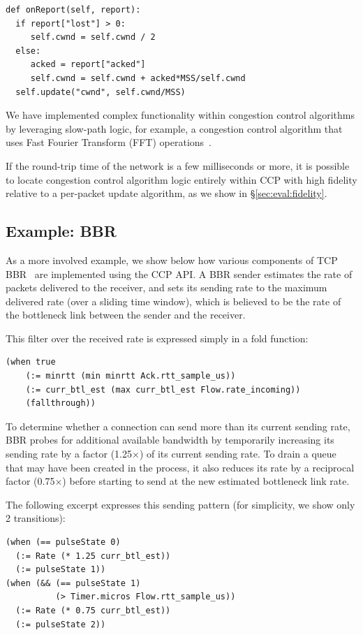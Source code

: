{\footnotesize
\begin{verbatim}
def onReport(self, report):
  if report["lost"] > 0:
     self.cwnd = self.cwnd / 2
  else:
     acked = report["acked"]
     self.cwnd = self.cwnd + acked*MSS/self.cwnd
  self.update("cwnd", self.cwnd/MSS)
\end{verbatim}
}

We have implemented complex functionality within congestion control algorithms
by leveraging slow-path logic, for example, a congestion control
algorithm that uses Fast Fourier Transform (FFT) operations~\cite{nimbus}.

If the round-trip time of the network is a few milliseconds or more,
it is possible to locate congestion control algorithm logic entirely within CCP
with high fidelity relative to a per-packet update algorithm, as we show in \S\ref{sec:eval:fidelity}.

\subsection{Example: BBR}
\label{s:ccp:bbr}
As a more involved example, we show below how various components of TCP BBR~\cite{bbr} are implemented using the CCP API.
A BBR sender estimates the rate of packets delivered to the receiver, and 
sets its sending rate to the maximum delivered rate (over a sliding time window), 
which is believed to be the rate of the bottleneck link between the sender and the receiver.

This filter over the received rate is expressed simply in a fold function:
{\footnotesize
\begin{verbatim}
(when true
    (:= minrtt (min minrtt Ack.rtt_sample_us))
    (:= curr_btl_est (max curr_btl_est Flow.rate_incoming))
    (fallthrough))
\end{verbatim}
}

To determine whether a connection can send more than its current sending rate,
BBR probes for additional available bandwidth by temporarily increasing its
sending rate by a factor (1.25$\times$) of its current sending rate.
%
To drain a queue that may have been created in the process, it also reduces its
rate by a reciprocal factor (0.75$\times$) before starting to send at the new estimated
bottleneck link rate.

The following excerpt expresses this sending pattern (for simplicity, we show only 2 transitions):
{\footnotesize
\begin{verbatim}
(when (== pulseState 0)
  (:= Rate (* 1.25 curr_btl_est))
  (:= pulseState 1))
(when (&& (== pulseState 1) 
          (> Timer.micros Flow.rtt_sample_us))
  (:= Rate (* 0.75 curr_btl_est))
  (:= pulseState 2))
\end{verbatim}
}

